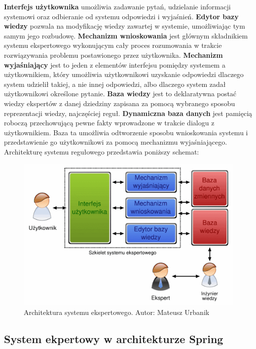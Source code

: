 \textbf{Interfejs użytkownika} umożliwia zadawanie pytań, udzielanie informacji systemowi oraz odbieranie od systemu odpowiedzi i wyjaśnień.
\textbf{Edytor bazy wiedzy} pozwala na modyfikację wiedzy zawartej w systemie, umożliwiając tym samym jego rozbudowę.
\textbf{Mechanizm wnioskowania} jest głównym składnikiem systemu ekspertowego wykonującym cały proces rozumowania w trakcie rozwiązywania problemu postawionego przez użytkownika.
\textbf{Mechanizm wyjaśniający} jest to jeden z elementów interfejsu pomiędzy systemem a użytkownikiem, który umożliwia użytkownikowi uzyskanie odpowiedzi dlaczego system udzielił takiej, a nie innej odpowiedzi, albo dlaczego system zadał użytkownikowi określone pytanie.
\textbf{Baza wiedzy} jest to deklaratywna postać wiedzy ekspertów z danej dziedziny zapisana za pomocą wybranego sposobu reprezentacji wiedzy, najczęściej reguł.
\textbf{Dynamiczna baza danych} jest pamięcią roboczą przechowującą pewne fakty wprowadzone w trakcie dialogu z użytkownikiem. Baza ta umożliwia odtworzenie sposobu wnioskowania systemu i przedstawienie go użytkownikowi za pomocą mechanizmu wyjaśniającego.
Architekturę systemu regułowego przedstawia poniższy schemat:
\begin{figure}[!ht]
\label{img:rysunek_expert}	
\includegraphics[scale=0.5]{images/expert-system}
\caption[Rysunek przedstawiający model architektury systemu ekspertowego]{Architektura systemu ekspertowego. Autor: Mateusz Urbanik}
\end{figure}

\subsection{System ekpertowy w architekturze Spring}
\label{sec:systemEkpertowyArchitekturaSpring}

